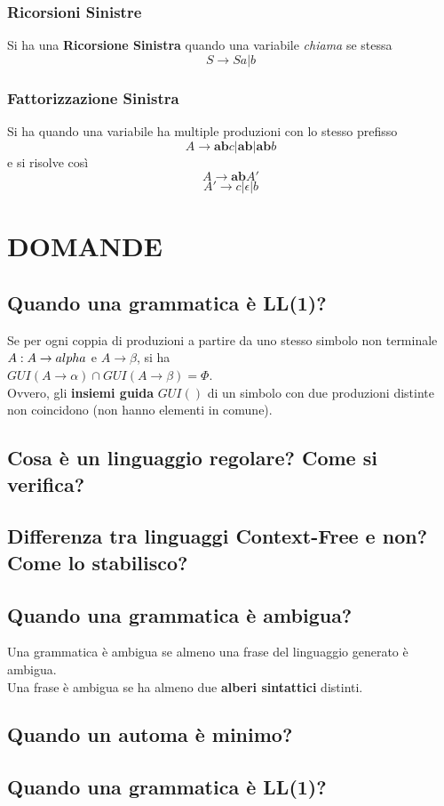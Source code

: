 \documentclass[12pt]{extarticle}
\begin{document}
\subsubsection{Ricorsioni Sinistre}
Si ha una \textbf{Ricorsione Sinistra} quando una variabile \textit{chiama} se stessa 
\begin{equation*}
    S \rightarrow Sa | b
\end{equation*}
\subsubsection{Fattorizzazione Sinistra}
Si ha quando una variabile ha multiple produzioni con lo stesso prefisso
\begin{equation*}
    A \rightarrow \textbf{ab}c|\textbf{ab}|\textbf{ab}b
\end{equation*}
e si risolve così
\begin{equation*}
    A \rightarrow \textbf{ab}A'
\end{equation*}
\begin{equation*}
    A' \rightarrow c|\epsilon|b
\end{equation*}


\newpage

\section{DOMANDE}
\subsection{Quando una grammatica è LL(1)?}
Se per ogni coppia di produzioni a partire da uno stesso simbolo non terminale $A:\\
A\rightarrow alpha$ e $A \rightarrow \beta$, si ha\\
$GUI(A \rightarrow \alpha) \cap GUI(A \rightarrow \beta) = \Phi$.\\
Ovvero, gli \textbf{insiemi guida} $GUI()$ di un simbolo con due produzioni distinte non coincidono (non hanno elementi in comune).

\subsection{Cosa è un linguaggio regolare? Come si verifica?}
\subsection{Differenza tra linguaggi Context-Free e non? Come lo stabilisco?}
\subsection{Quando una grammatica è ambigua?}
Una grammatica è ambigua se almeno una frase del linguaggio generato è ambigua.\\
Una frase è ambigua se ha almeno due \textbf{alberi sintattici} distinti.
\subsection{Quando un automa è minimo?}
\subsection{Quando una grammatica è LL(1)?}
\end{document}
